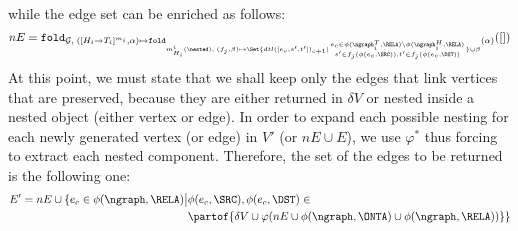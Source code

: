 while the edge set can be enriched as follows:
\begin{equation}\label{eq:newgenE}
nE=\texttt{fold}_{\mathcal{G},\;([H_i\to T_i]^{m_i},\alpha)\mapsto \texttt{fold}_{m^i_{H_i}(\nested),\;(f_j,\beta)\mapsto \Set{dtl([e_c,s',t'])_{c+1}|\genfrac{}{}{0pt}{}{e_c\in \phi(\ngraph_i^T,\RELA)\backslash\phi(\ngraph_i^H,\RELA)}{s'\in f_j(\phi(e_c,\SRC)),t'\in f_j(\phi(e_c,\DST))}}\cup\beta }(\alpha)}([])
\end{equation}
At this point, we must state that we shall keep only the edges that link vertices that are preserved, because they are either returned in $\delta V$ or nested inside a nested object (either vertex or edge). In order to expand each possible nesting for each newly generated vertex (or edge) in $V'$ (or $nE\cup E$), we use $\varphi^*$  thus forcing to extract each nested component. Therefore, the set of the edges to be returned is the following one:
\begin{equation}\label{eq:eFinal}
\begin{split}
E' = nE \cup \{e_c\in \phi(\ngraph,\RELA)\big |&\phi(e_c,\SRC),\phi(e_c,\DST)\in\\
	&\partof{\delta V\cup\varphi(nE\cup \phi(\ngraph,\ONTA)\cup \phi(\ngraph,\RELA))}\}\\
\end{split}

\end{equation}



